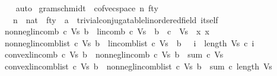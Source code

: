 \begin{isabellebody}
%
\isadelimproof
\ \ %
\endisadelimproof
%
\isatagproof
{}\isamarkupfalse%
\ auto%
\endisatagproof
{\isafoldproof}%
%
\isadelimproof
\isanewline
%
\endisadelimproof
\isanewline
{}\isamarkupfalse%
\ gram{\isacharunderscore}{\kern0pt}schmidt{}\ {\isacharequal}{\kern0pt}\ cof{\isacharunderscore}{\kern0pt}vec{\isacharunderscore}{\kern0pt}space\ n\ f{\isacharunderscore}{\kern0pt}ty\isanewline
\ \ \ n\ {\isacharcolon}{\kern0pt}{\isacharcolon}{\kern0pt}\ nat\ \ f{\isacharunderscore}{\kern0pt}ty\ {\isacharcolon}{\kern0pt}{\isacharcolon}{\kern0pt}\ {\isachardoublequoteopen}{\isacharprime}{\kern0pt}a\ {\isacharcolon}{\kern0pt}{\isacharcolon}{\kern0pt}\ {\isacharbraceleft}{\kern0pt}trivial{\isacharunderscore}{\kern0pt}conjugatable{\isacharunderscore}{\kern0pt}linordered{\isacharunderscore}{\kern0pt}field{\isacharbraceright}{\kern0pt}\ itself{\isachardoublequoteclose}\isanewline
{}\isanewline
\isanewline
{}\isamarkupfalse%
\ {\isachardoublequoteopen}nonneg{\isacharunderscore}{\kern0pt}lincomb\ c\ Vs\ b\ {\isacharequal}{\kern0pt}\ {\isacharparenleft}{\kern0pt}lincomb\ c\ Vs\ {\isacharequal}{\kern0pt}\ b\ {\isasymand}\ c\ {\isacharbackquote}{\kern0pt}\ Vs\ {\isasymsubseteq}\ {\isacharbraceleft}{\kern0pt}x{\isachardot}{\kern0pt}\ x\ {\isasymge}\ {}{\isacharbraceright}{\kern0pt}{\isacharparenright}{\kern0pt}{\isachardoublequoteclose}\isanewline
{}\isamarkupfalse%
\ {\isachardoublequoteopen}nonneg{\isacharunderscore}{\kern0pt}lincomb{\isacharunderscore}{\kern0pt}list\ c\ Vs\ b\ {\isacharequal}{\kern0pt}\ {\isacharparenleft}{\kern0pt}lincomb{\isacharunderscore}{\kern0pt}list\ c\ Vs\ {\isacharequal}{\kern0pt}\ b\ {\isasymand}\ {\isacharparenleft}{\kern0pt}{\isasymforall}\ i\ {\isacharless}{\kern0pt}\ length\ Vs{\isachardot}{\kern0pt}\ c\ i\ {\isasymge}\ {}{\isacharparenright}{\kern0pt}{\isacharparenright}{\kern0pt}{\isachardoublequoteclose}\isanewline
{}\isamarkupfalse%
\ {\isachardoublequoteopen}convex{\isacharunderscore}{\kern0pt}lincomb\ c\ Vs\ b\ {\isacharequal}{\kern0pt}\ {\isacharparenleft}{\kern0pt}nonneg{\isacharunderscore}{\kern0pt}lincomb\ c\ Vs\ b\ {\isasymand}\ sum\ c\ Vs\ {\isacharequal}{\kern0pt}\ {}{\isacharparenright}{\kern0pt}{\isachardoublequoteclose}\isanewline
{}\isamarkupfalse%
\ {\isachardoublequoteopen}convex{\isacharunderscore}{\kern0pt}lincomb{\isacharunderscore}{\kern0pt}list\ c\ Vs\ b\ {\isacharequal}{\kern0pt}\ {\isacharparenleft}{\kern0pt}nonneg{\isacharunderscore}{\kern0pt}lincomb{\isacharunderscore}{\kern0pt}list\ c\ Vs\ b\ {\isasymand}\ sum\ c\ {\isacharbraceleft}{\kern0pt}{}{\isachardot}{\kern0pt}{\isachardot}{\kern0pt}{\isacharless}{\kern0pt}length\ Vs{\isacharbraceright}{\kern0pt}\ {\isacharequal}{\kern0pt}\ {}{\isacharparenright}{\kern0pt}{\isachardoublequoteclose}\isanewline

\end{isabellebody}
